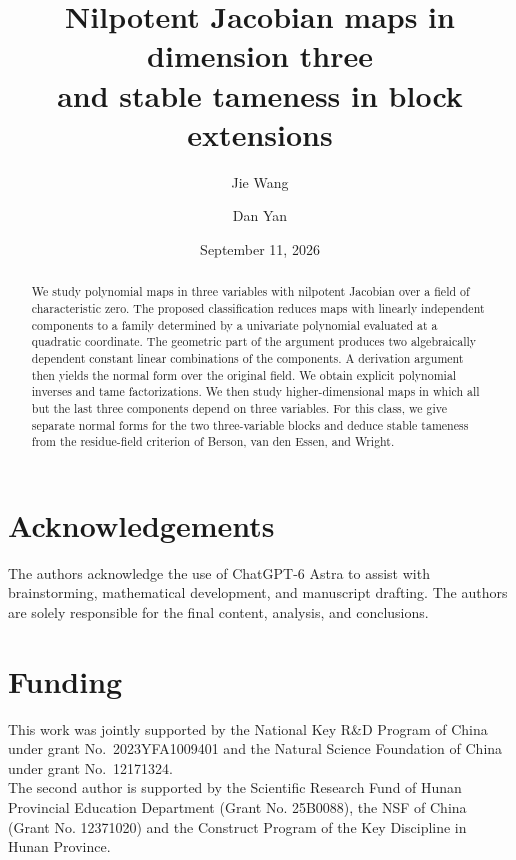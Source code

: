 \documentclass[11pt,reqno]{amsart}
\title[Nilpotent Jacobian maps and stable tameness]{Nilpotent Jacobian maps in dimension three\protect\\ and stable tameness in block extensions}
\author{Jie Wang}
\author{Dan Yan}
\date{September 11, 2026}
\begin{document}
\begin{abstract}
We study polynomial maps in three variables with nilpotent Jacobian over a field of characteristic zero. The proposed classification reduces maps with linearly independent components to a family determined by a univariate polynomial evaluated at a quadratic coordinate. The geometric part of the argument produces two algebraically dependent constant linear combinations of the components. A derivation argument then yields the normal form over the original field. We obtain explicit polynomial inverses and tame factorizations. We then study higher-dimensional maps in which all but the last three components depend on three variables. For this class, we give separate normal forms for the two three-variable blocks and deduce stable tameness from the residue-field criterion of Berson, van den Essen, and Wright.
\end{abstract}
\maketitle







\section*{Acknowledgements}
The authors acknowledge the use of ChatGPT-6 Astra to assist with brainstorming, mathematical development, and manuscript drafting. The authors are solely responsible for the final content, analysis, and conclusions.

\section*{Funding}
This work was jointly supported by the National Key R\&D Program of China under grant No.~2023YFA1009401 and the Natural Science Foundation of China under grant No.~12171324.\\ 

The second author is supported by the Scientific Research Fund of Hunan Provincial Education Department (Grant No. 25B0088), the NSF of China (Grant No. 12371020) and the Construct Program of the Key Discipline in Hunan Province.



\end{document}
